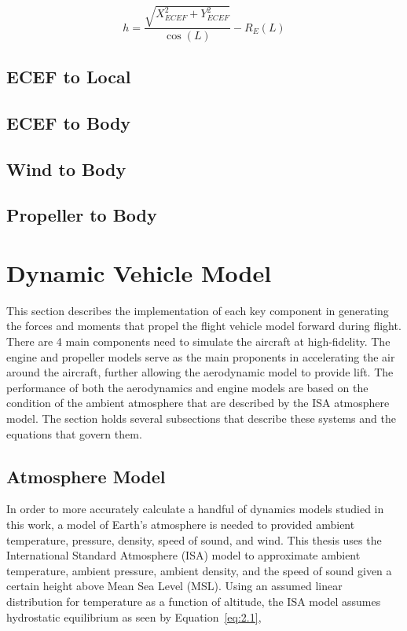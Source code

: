 \documentclass[12pt]{report}
\begin{document}
\begin{equation}\label{eq:ecef2llaaltitude}
  h = \frac{\sqrt{X_{ECEF}^2 + Y^2_{ECEF}}}{\cos\left(L\right)} - R_E (L)
\end{equation}


\subsection{ECEF to Local}

\subsection{ECEF to Body}

\subsection{Wind to Body}

\subsection{Propeller to Body}


\clearpage
\section{Dynamic Vehicle Model}
This section describes the implementation of each key component in generating the forces and moments that propel the flight vehicle model forward during flight. There are 4 main components need to simulate the aircraft at high-fidelity. The engine and propeller models serve as the main proponents in accelerating the air around the aircraft, further allowing the aerodynamic model to provide lift. The performance of both the aerodynamics and engine models are based on the condition of the ambient atmosphere that are described by the ISA atmosphere model. The section holds several subsections that describe these systems and the equations that govern them.
\clearpage
\subsection{Atmosphere Model}
In order to more accurately calculate a handful of dynamics models studied in this work, a model of Earth's atmosphere is needed to provided ambient temperature, pressure, density, speed of sound, and wind. This thesis uses the International Standard Atmosphere (ISA) model to approximate ambient temperature, ambient pressure, ambient density, and the speed of sound given a certain height above Mean Sea Level (MSL). Using an assumed linear distribution for temperature as a function of altitude, the ISA model assumes hydrostatic equilibrium as seen by Equation~\ref{eq:2.1},
\end{document}
